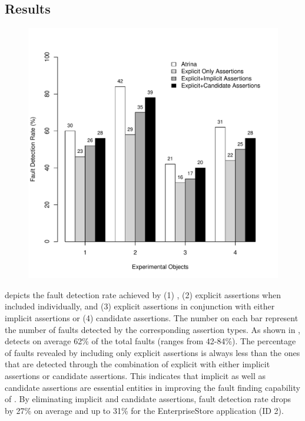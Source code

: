 \subsection{Results} \label{Sec:results}
\begin{figure}[!t]
  \centering
  \includegraphics[width=1\hsize]{r-scripts/assertionTypeFaultDetec}
  \vspace{-0.18in} 
  \vspace{-0.1in} 
  \label{Fig:assertionTypeFaultDetec} 
\end{figure}
  depicts the fault detection rate achieved by (1) \tool, (2) explicit assertions when included individually, and (3) explicit assertions in conjunction with either implicit assertions or (4) candidate assertions. The number on each bar represent the number of faults detected by the corresponding assertion types. As shown in , \tool detects on average 62\% of the total faults (ranges from 42-84\%).
The percentage of faults revealed by including only explicit assertions is always less than the ones that are detected through the combination of explicit with either implicit assertions or candidate assertions. This indicates that implicit as well as candidate assertions are essential entities in improving the fault finding capability of \tool. By eliminating implicit and candidate assertions, fault detection rate drops by 27\% on average and up to 31\% for the EnterpriseStore application (ID 2).

